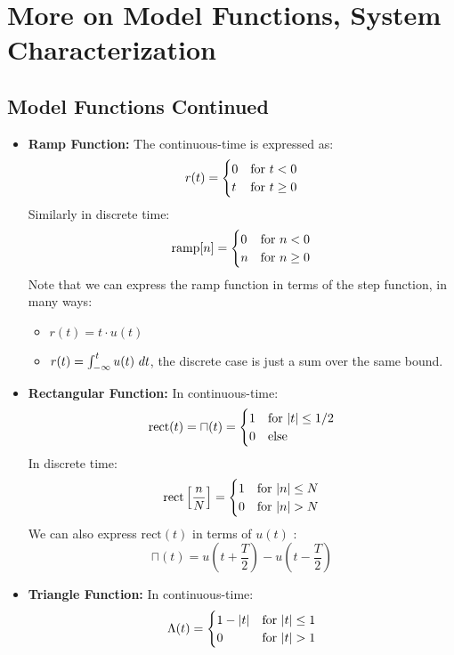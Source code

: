 \section{More on Model Functions, System Characterization}
\subsection{Model Functions Continued}
\begin{itemize}
	\item \textbf{Ramp Function:} The continuous-time is expressed as:
		\[
		r(t) = \begin{cases}
			0 & \text{for \( t < 0 \)}\\
			t & \text{for \( t \ge 0 \)}
		\end{cases}
		\] 
		Similarly in discrete time:
		\[
			\text{ramp}[n] = \begin{cases}
				0 & \text{for \( n < 0 \)}\\
				n & \text{for \( n \ge 0 \)}
			\end{cases}
		\] 
		Note that we can express the ramp function in terms of the step function, in many ways:
		\begin{itemize}
			\item \( r(t) = t \cdot u(t) \)
			\item \( r(t) = \int_{-\infty}^{t}u(t) \ d t \), the discrete case is just a sum over the same bound.
		\end{itemize}
	\item \textbf{Rectangular Function:} In continuous-time:
		\[
		\text{rect}(t) = \sqcap(t) = \begin{cases}
			1 & \text{for \( |t| \le  1 / 2 \)}\\
			0 & \text{else}
		\end{cases}
		\] 
		In discrete time:
		\[
		\text{rect}\left[ \frac{n}{N} \right] = \begin{cases}
			1 & \text{for \( |n| \le  N \)}\\
			0 & \text{for \( |n| > N \)}
		\end{cases}
		\] 
		We can also express \( \text{rect}(t) \) in terms of \( u(t) \) :
		\[
			\sqcap(t) = u\left( t + \frac{T}{2} \right)	- u\left( t - \frac{T}{2} \right) 
		\] 
	\item \textbf{Triangle Function:} In continuous-time:
		\[
		\Lambda(t) = \begin{cases}
			1 - |t| & \text{for \( |t| \le  1 \)}\\
			0 & \text{for \( |t| > 1 \)}
		\end{cases}
\]
\end{itemize}
